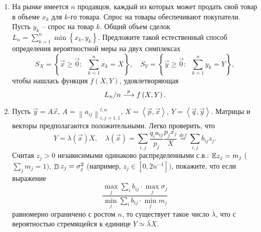 \begin{problem}
\begin{enumerate}
\item На рынке имеется $n$ 
продавцов, каждый из которых может продать свой товар в объеме $x_k $ для 
$k$-го товара. Спрос на товары обеспечивают покупатели. Пусть $y_k$ -- спрос на 
товар $k$. Общий объем сделок $L_n=\sum\limits_{k=1}^n {\min 
\left\{ {x_k ,y_k } \right\}} $. Предложите такой естественный способ 
определения вероятностной меры на двух симплексах
\[
S_X =\left\{ {\vec {x}\ge \vec {0}:\;\;\sum\limits_{k=1}^n {x_k } =X} 
\right\},
\quad
S_Y =\left\{ {\vec {y}\ge \vec {0}:\;\;\sum\limits_{k=1}^n {y_k } =Y} 
\right\},
\]
чтобы нашлась функция $f\left( {X,Y} \right)$, удовлетворяющая  $$L_n 
\mathord{\left/ {\vphantom {L n}} \right. \kern-\nulldelimiterspace} 
n\buildrel p \over \longrightarrow f\left( {X,Y} \right).$$

\item Пусть $\vec {y}=A\vec {x}$, $A=\left\| {a_{ij} } 
\right\|_{i,j=1,1}^{l,n} $, $X=\left\langle {\vec {p},\vec {x}} 
\right\rangle $, $Y=\left\langle {\vec {q},\vec {y}} \right\rangle $. 
Матрицы и векторы предполагаются положительными. Легко проверить, что
\[
Y=\lambda \left( {\vec {x}} \right)X,
\quad
\lambda \left( {\vec {x}} \right)=\sum\limits_{i,j} {\frac{q_i a_{ij} }{p_j 
}} \frac{p_j x_j }{X}\mathop =\limits^{def} \sum\limits_{i,j} {b_{ij} } z_j 
.
\]
Считая $z_j >0$ независимыми одинаково распределенными с.в.: $\mathrm{{\mathbb E}} z_j =m_j $ 
($\sum_{j} m_j  =1)$, $\mathop{\mathbb{D}}\nolimits z_j =\sigma _j^2 $ (например, $z_j \in 
\left[ {0,2n^{-1}} \right])$, покажите, что если выражение
\[
\frac{\mathop {\max }\limits_j \sum\limits_i {b_{ij} } \cdot \mathop {\max 
}\limits_j \sigma _j }{\mathop {\min }\limits_j \sum\limits_i {b_{ij} } 
\cdot \mathop {\min }\limits_j m_j }
\]
равномерно ограничено с ростом $n$, то существует такое число $\bar {\lambda 
}$, что с вероятностью стремящейся к единице $Y\simeq \bar {\lambda }X$.

\end{enumerate}
\end{problem}


